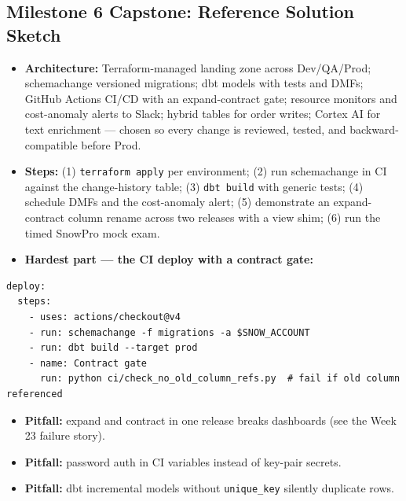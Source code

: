 \documentclass[11pt, a4paper]{article}
\begin{document}
\subsection*{Milestone 6 Capstone: Reference Solution Sketch}
\begin{itemize}[label=-, nosep]
    \item \textbf{Architecture:} Terraform-managed landing zone across Dev/QA/Prod; schemachange versioned migrations; dbt models with tests and DMFs; GitHub Actions CI/CD with an expand-contract gate; resource monitors and cost-anomaly alerts to Slack; hybrid tables for order writes; Cortex AI for text enrichment --- chosen so every change is reviewed, tested, and backward-compatible before Prod.
    \item \textbf{Steps:} (1) \texttt{terraform apply} per environment; (2) run schemachange in CI against the change-history table; (3) \texttt{dbt build} with generic tests; (4) schedule DMFs and the cost-anomaly alert; (5) demonstrate an expand-contract column rename across two releases with a view shim; (6) run the timed SnowPro mock exam.
    \item \textbf{Hardest part --- the CI deploy with a contract gate:}
\end{itemize}
\begin{lstlisting}[caption={GitHub Actions deploy job (pseudocode)}]
deploy:
  steps:
    - uses: actions/checkout@v4
    - run: schemachange -f migrations -a $SNOW_ACCOUNT
    - run: dbt build --target prod
    - name: Contract gate
      run: python ci/check_no_old_column_refs.py  # fail if old column referenced
\end{lstlisting}
\begin{itemize}[label=-, nosep]
    \item \textbf{Pitfall:} expand and contract in one release breaks dashboards (see the Week 23 failure story).
    \item \textbf{Pitfall:} password auth in CI variables instead of key-pair secrets.
    \item \textbf{Pitfall:} dbt incremental models without \texttt{unique\_key} silently duplicate rows.
\end{itemize}
\end{document}
